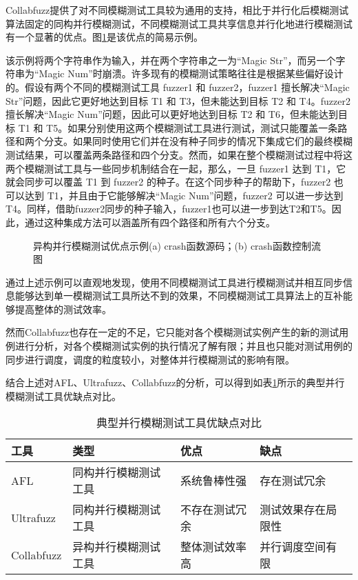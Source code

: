\documentclass[master]{thesis-uestc}
\begin{document}
Collabfuzz提供了对不同模糊测试工具较为通用的支持，相比于并行化后模糊测试算法固定的同构并行模糊测试，不同模糊测试工具共享信息并行化地进行模糊测试有一个显著的优点。图\ref{motivation}是该优点的简易示例。

该示例将两个字符串作为输入，并在两个字符串之一为“Magic Str”，而另一个字符串为“Magic Num”时崩溃。许多现有的模糊测试策略往往是根据某些偏好设计的。假设有两个不同的模糊测试工具 fuzzer1 和 fuzzer2，fuzzer1 擅长解决“Magic Str”问题，因此它更好地达到目标 T1 和 T3，但未能达到目标 T2 和 T4。fuzzer2 擅长解决“Magic Num”问题，因此可以更好地达到目标 T2 和 T6，但未能达到目标 T1 和 T5。如果分别使用这两个模糊测试工具进行测试，测试只能覆盖一条路径和两个分支。如果同时使用它们并在没有种子同步的情况下集成它们的最终模糊测试结果，可以覆盖两条路径和四个分支。然而，如果在整个模糊测试过程中将这两个模糊测试工具与一些同步机制结合在一起，那么，一旦 fuzzer1 达到 T1，它就会同步可以覆盖 T1 到 fuzzer2 的种子。在这个同步种子的帮助下，fuzzer2 也可以达到 T1，并且由于它能够解决“Magic Num”问题，fuzzer2 可以进一步达到 T4。同样，借助fuzzer2同步的种子输入，fuzzer1也可以进一步到达T2和T5。因此，通过这种集成方法可以涵盖所有四个路径和所有六个分支。

\begin{figure}[!htbp]
    \vspace{6pt}
    \quad
    \caption{异构并行模糊测试优点示例(a) crash函数源码；(b) crash函数控制流图}
    \label{motivation}
\end{figure}

通过上述示例可以直观地发现，使用不同模糊测试工具进行模糊测试并相互同步信息能够达到单一模糊测试工具所达不到的效果，不同模糊测试工具算法上的互补能够提高整体的测试效率。

然而Collabfuzz也存在一定的不足，它只能对各个模糊测试实例产生的新的测试用例进行分析，对各个模糊测试实例的执行情况了解有限；并且也只能对测试用例的同步进行调度，调度的粒度较小，对整体并行模糊测试的影响有限。


结合上述对AFL、Ultrafuzz、Collabfuzz的分析，可以得到如表\ref{table1}所示的典型并行模糊测试工具优缺点对比。

\begin{table}[!htbp]
    \caption{典型并行模糊测试工具优缺点对比}
    \begin{tabular}{llll}
    \toprule
    工具& 类型 & 优点 & 缺点 \\
    \midrule
    AFL & 同构并行模糊测试工具 & 系统鲁棒性强 & 存在测试冗余 \\
    Ultrafuzz & 同构并行模糊测试工具 & 不存在测试冗余 & 测试效果存在局限性 \\
    Collabfuzz & 异构并行模糊测试工具 & 整体测试效率高 & 并行调度空间有限 \\
    \bottomrule
    \end{tabular}
    \label{table1}
    \vspace{6pt}
\end{table}
\end{document}
